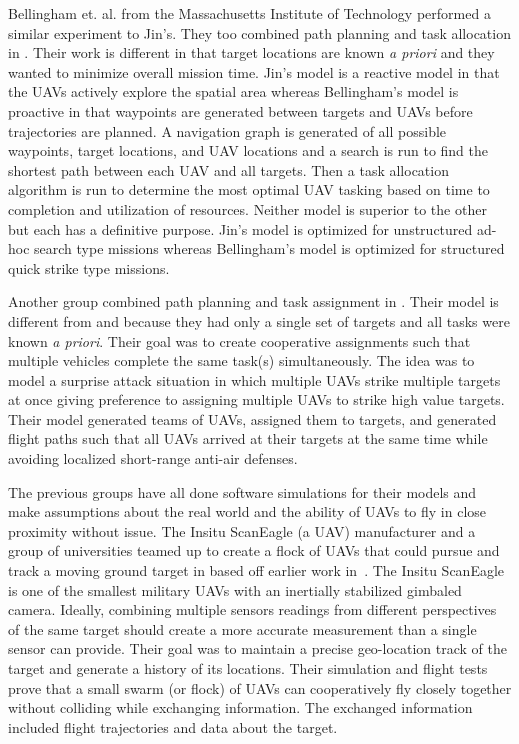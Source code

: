 Bellingham et. al. from the Massachusetts Institute of Technology performed a similar experiment to Jin's.   They too combined path planning and task allocation in \cite{bellingham}.  Their work is different in that target locations are known \textit{a priori} and they wanted to minimize overall mission time.  Jin's model is a reactive model in that the UAVs actively explore the spatial area whereas Bellingham's model is proactive in that waypoints are generated between targets and UAVs before trajectories are planned.  A navigation graph is generated of all possible waypoints, target locations, and UAV locations and a search is run to find the shortest path between each UAV and all targets.  Then a task allocation algorithm is run to determine the most optimal UAV tasking based on time to completion and utilization of resources.  Neither model is superior to the other but each has a definitive purpose.  Jin's model is optimized for unstructured ad-hoc search type missions whereas Bellingham's model is optimized for structured quick strike type missions.

Another group combined path planning and task assignment in \cite{beard}.  Their model is different from \cite{jin} and \cite{bellingham} because they had only a single set of targets and all tasks were known \textit{a priori}.  Their goal was to create cooperative assignments such that multiple vehicles complete the same task(s) simultaneously.  The idea was to model a surprise attack situation in which multiple UAVs strike multiple targets at once giving preference to assigning multiple UAVs to strike high value targets.  Their model generated teams of UAVs, assigned them to targets, and generated flight paths such that all UAVs arrived at their targets at the same time while avoiding localized short-range anti-air defenses.

The previous groups have all done software simulations for their models and make assumptions about the real world and the ability of UAVs to fly in close proximity without issue.  The Insitu ScanEagle (a UAV) manufacturer and a group of universities teamed up to create a flock of UAVs that could pursue and track a moving ground target in \cite{wheeler} based off earlier work in~\cite{wise_rolf}.  The Insitu ScanEagle is one of the smallest military UAVs with an inertially stabilized gimbaled camera.  Ideally, combining multiple sensors readings from different perspectives of the same target should create a more accurate measurement than a single sensor can provide.  Their goal was to maintain a precise geo-location track of the target and generate a history of its locations.  Their simulation and flight tests prove that a small swarm (or flock) of UAVs can cooperatively fly closely together without colliding while exchanging information.  The exchanged information included flight trajectories and data about the target. 

